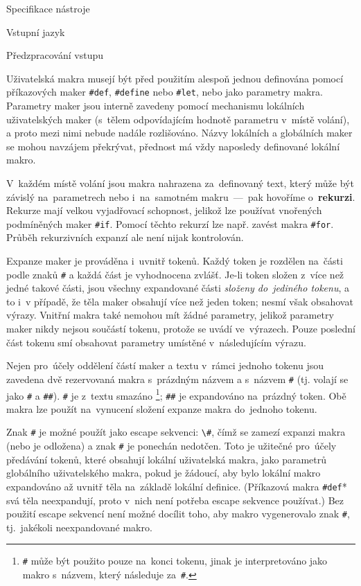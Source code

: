 \documentclass[thesis=M,czech]{FITthesis}[2012/06/26]
\newcommand{\id}[1]{\texttt{#1}}
\newcommand{\hl}[1]{\textit{#1}}
\newcommand{\hll}[1]{\textbf{#1}}
\begin{document}
\begin{section}{Specifikace nástroje}
\begin{subsection}{Vstupní jazyk}
\begin{subsubsection}{Předzpracování vstupu}

\begin{paragraph}{Uživatelská makra}
\label{p:design:spec:ilang:macros:user}
musejí být před použitím alespoň jednou definována
pomocí příkazových maker \id{\#def}, \id{\#define} nebo \id{\#let},
nebo jako parametry makra.
Parametry maker jsou interně zavedeny pomocí mechanismu
lokálních uživatelských maker
(s~tělem odpovídajícím hodnotě parametru v~místě volání),
a proto mezi nimi
nebude nadále rozlišováno.
Názvy lokálních a globálních maker se mohou navzájem překrývat,
přednost má vždy naposledy definované lokální makro.

V~každém místě volání jsou makra nahrazena za~definovaný text,
který může být závislý na~parametrech
nebo i~na~samotném makru~---~pak hovoříme o~\hll{rekurzi}.
Rekurze mají velkou vyjadřovací schopnost,
jelikož lze používat vnořených podmíněných maker \id{\#if}.
Pomocí těchto rekurzí lze např. zavést
makra \id{\#for}.
Průběh rekurzivních expanzí ale není nijak kontrolován.

Expanze maker je prováděna i~uvnitř tokenů.
Každý token je rozdělen na~části
podle znaků \id{\#}
a každá část je vyhodnocena zvlášť.
Je-li token složen z~více než jedné takové části,
jsou všechny expandované části \hl{složeny do~jediného tokenu},
a to i~v případě, že těla maker obsahují více než jeden token;
nesmí však obsahovat výrazy.
Vnitřní makra také nemohou mít žádné parametry,
jelikož parametry maker nikdy nejsou součástí tokenu,
protože se uvádí ve~výrazech.
Pouze poslední část tokenu smí obsahovat parametry
umístěné v~následujícím výrazu.

Nejen pro~účely oddělení částí maker a textu v~rámci jednoho tokenu
jsou zavedena dvě rezervovaná makra s~prázdným názvem
a s~názvem \id{\#}
(tj. volají se jako \id{\#} a \id{\#\#}).
\id{\#} je z~textu smazáno%
\footnote{\id{\#} může být použito pouze na~konci tokenu,
jinak je interpretováno jako makro s~názvem,
který následuje za~\id{\#}.};
\id{\#\#} je expandováno na~prázdný token.
Obě makra lze použít na~vynucení složení expanze makra do~jednoho tokenu.

Znak \id{\#} je možné použít jako escape sekvenci:
\id{\textbackslash\#},
čímž se zamezí expanzi makra (nebo je odložena)
a znak \id{\#} je ponechán nedotčen.
Toto je užitečné pro~účely předávání
tokenů, které obsahují lokální uživatelská makra,
jako parametrů globálního uživatelského makra,
pokud je žádoucí, aby bylo lokální makro expandováno až uvnitř těla
na~základě lokální definice.
(Příkazová makra \id{\#def}* svá těla neexpandují,
proto v~nich není potřeba escape sekvence používat.)
Bez použití escape sekvencí
není možné docílit toho, aby makro vygenerovalo znak \id{\#},
tj.~jakékoli neexpandované makro.


\end{paragraph}
\end{subsubsection}
\end{subsection}
\end{section}
\end{document}

